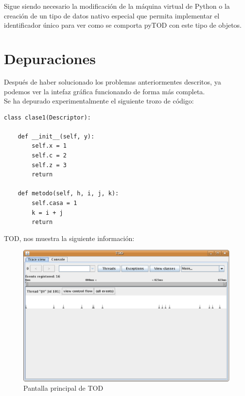 \documentclass[10pt,a4paper]{article}
\begin{document}
Sigue siendo necesario la modificación de la máquina virtual de Python o la creación de un tipo de datos nativo especial que permita implementar el identificador único para ver como se comporta pyTOD con este tipo de objetos.


\newpage
\section{Depuraciones}

Después de haber solucionado los problemas anteriormentes descritos, ya podemos ver la intefaz gráfica funcionando de forma más completa.\\

Se ha depurado experimentalmente el siguiente trozo de código:\\

\begin{verbatim}
class clase1(Descriptor):
    
    def __init__(self, y):
        self.x = 1
        self.c = 2
        self.z = 3
        return
    
    def metodo(self, h, i, j, k):
        self.casa = 1
        k = i + j
        return
\end{verbatim}

TOD, nos muestra la siguiente información:\\

\begin{figure}[hpb]
	\centering
	\includegraphics[scale=0.3]{images/TOD-1.eps}
	\caption{Pantalla principal de TOD}
\end{figure}
\end{document}
